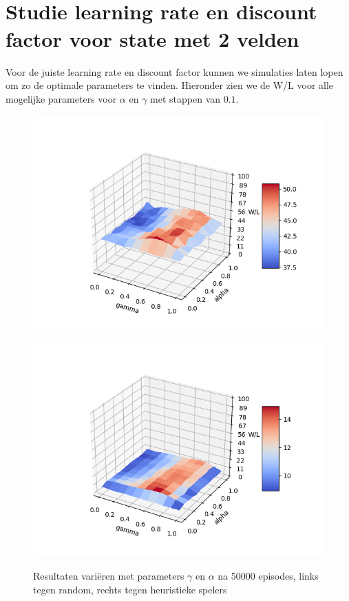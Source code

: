\documentclass[11pt]{article}
\begin{document}
\appendix
\section{\\Studie learning rate en discount factor voor state met 2 velden}
\label{appendix:parameters}
Voor de juiste learning rate en discount factor kunnen we simulaties laten lopen om zo de optimale parameters te vinden. Hieronder zien we de W/L voor alle mogelijke parameters voor $\alpha$ en $\gamma$ met stappen van $0.1$.
\begin{figure}[h]
\centering
\includegraphics[scale=0.50]{images/qtable_parameter_random.png}
\includegraphics[scale=0.50]{images/qtable_parameter_heuristic.png}
\caption{Resultaten variëren met parameters $\gamma$ en $\alpha$ na 50000 episodes, links tegen random, rechts tegen heuristieke spelers}
\end{figure}
\end{document}
